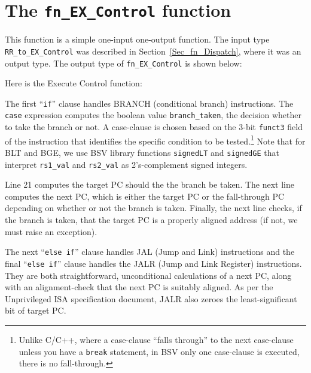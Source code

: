 

\section{The {\tt fn\_EX\_Control} function}

\label{Sec_fn_EX_Control}


This function is a simple one-input one-output function.  The input
type \verb|RR_to_EX_Control| was described in
Section~\ref{Sec_fn_Dispatch}, where it was an output type.  The
output type of \verb|fn_EX_Control| is shown below:


Here is the Execute Control function:


The first ``\verb|if|'' clause handles BRANCH (conditional branch)
instructions.  The \verb|case| expression computes the boolean value
\verb|branch_taken|, {\ie} the decision whether to take the branch or
not.  A case-clause is chosen based on the 3-bit \verb|funct3| field
of the instruction that identifies the specific condition to be
tested.\footnote{Unlike C/C++, where a case-clause ``falls through''
to the next case-clause unless you have a {\tt break} statement, in
BSV only one case-clause is executed, there is no fall-through.}  Note
that for BLT and BGE, we use BSV library functions \verb|signedLT| and
\verb|signedGE| that interpret \verb|rs1_val| and \verb|rs2_val| as
2's-complement signed integers.

Line 21 computes the target PC should the the branch be taken.  The
next line computes the next PC, which is either the target PC or the
fall-through PC depending on whether or not the branch is taken.
Finally, the next line checks, if the branch is taken, that the target PC is
a properly aligned address (if not, we must raise an exception).

The next ``\verb|else if|'' clause handles JAL (Jump and Link)
instructions and the final ``\verb|else if|'' clause handles the JALR
(Jump and Link Register) instructions.  They are both straightforward,
unconditional calculations of a next PC, along with an alignment-check
that the next PC is suitably aligned.  As per the Unprivileged ISA
specification document, JALR also zeroes the least-significant bit of
target PC.

